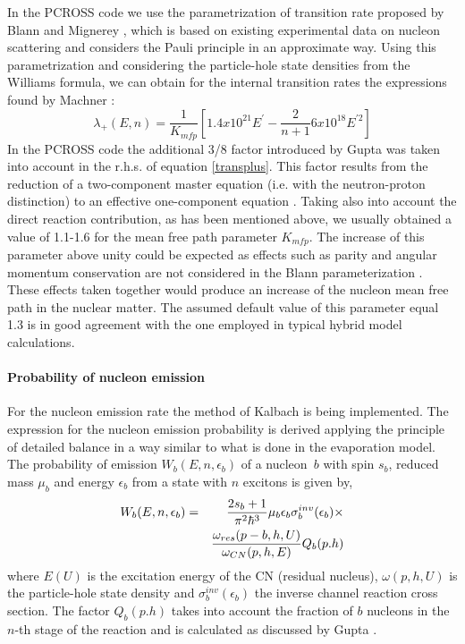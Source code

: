 In the PCROSS code we use the parametrization of transition rate proposed by
Blann and Mignerey \cite{Blann:72a}, which is based on existing experimental
data on nucleon scattering and considers the Pauli principle in an
approximate way. Using this parametrization and considering the
particle-hole state densities from the Williams formula, we can obtain for
the internal transition rates the expressions found by Machner \cite{Machner:81}:
\begin{equation}
\lambda _{+}(E,n)=\frac{1}{K_{mfp}}\left[ 1.4x10^{21}E^{\prime }-\frac{2}{n+1%
}6x10^{18}E^{\prime 2}\right]  \label{transplus}
\end{equation}%
In the PCROSS code the additional 3/8 factor introduced by Gupta \cite%
{Gupta:81} was taken into account in the r.h.s. of equation \ref{transplus}.
This factor results from the reduction of a two-component master equation
(i.e. with the neutron-proton distinction) to an effective one-component
equation \cite{Gupta:81}. Taking also into account the direct reaction
contribution, as has been mentioned above, we usually obtained a value of
1.1-1.6 for the mean free path parameter $K_{mfp}$. The increase of this
parameter above unity could be expected as effects such as parity and
angular momentum conservation are not considered in the Blann
parameterization \cite{Blann:72a}. These effects taken together would
produce an increase of the nucleon mean free path in the nuclear matter. The
assumed default value of this parameter equal 1.3 is in good agreement with
the one employed in typical hybrid model calculations.

\paragraph{Probability of nucleon emission}

For the nucleon emission rate the method of Kalbach \cite%
{Cline:71,Cline:72,Kalbach:77} is being implemented. The expression for the
nucleon emission probability is derived applying the principle of detailed
balance in a way similar to what is done in the evaporation model. The
probability of emission $W_{b}(E,n,\epsilon _{b})$ of a nucleon\textit{\ }$b$
with spin $s_{b}$, reduced mass $\mu _{b}$ and energy $\epsilon _{b}$ from a
state with $n$ excitons is given by,
\begin{eqnarray}
W_{b}(E,n,\epsilon _{b})&=&\frac{2s_{b}+1}{\pi ^{2}\hbar ^{3}}\mu
_{b}\epsilon _{b}\sigma _{b}^{inv}(\epsilon _{b})\times  \notag \\
&&\frac{\omega _{res}(p-b,h,U)}{\omega _{CN}(p,h,E)}Q_{b}(p.h)
\end{eqnarray}%
where $E(U)$ is the excitation energy of the CN (residual nucleus), $\omega
(p,h,U)$ is the particle-hole state density and $\sigma _{b}^{inv}(\epsilon
_{b})$ the inverse channel reaction cross section. The factor $Q_{b}(p.h)$
takes into account the fraction of $b$ nucleons in the $n$-th stage of the
reaction and is calculated as discussed by Gupta \cite{Gupta:81}.

